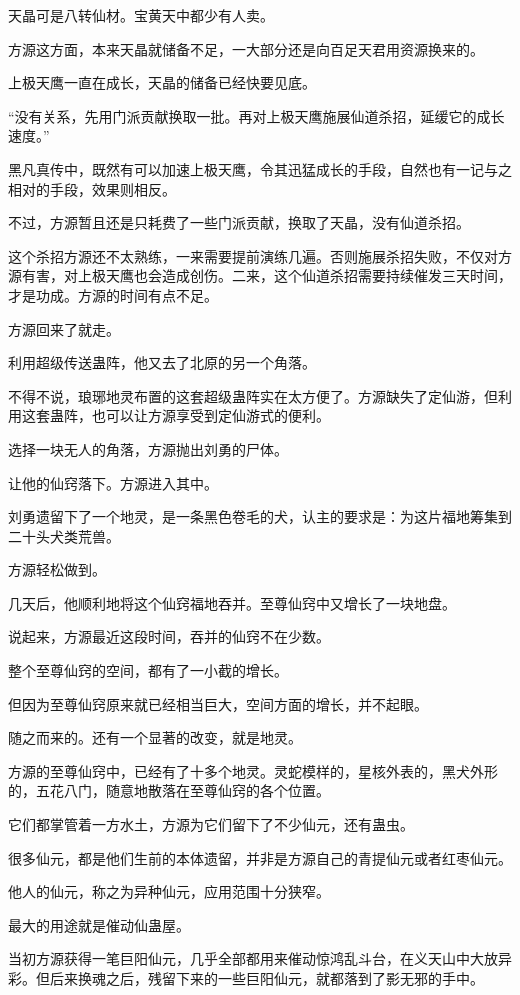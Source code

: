 \begin{this_body}
天晶可是八转仙材。宝黄天中都少有人卖。

方源这方面，本来天晶就储备不足，一大部分还是向百足天君用资源换来的。

上极天鹰一直在成长，天晶的储备已经快要见底。

“没有关系，先用门派贡献换取一批。再对上极天鹰施展仙道杀招，延缓它的成长速度。”

黑凡真传中，既然有可以加速上极天鹰，令其迅猛成长的手段，自然也有一记与之相对的手段，效果则相反。

不过，方源暂且还是只耗费了一些门派贡献，换取了天晶，没有仙道杀招。

这个杀招方源还不太熟练，一来需要提前演练几遍。否则施展杀招失败，不仅对方源有害，对上极天鹰也会造成创伤。二来，这个仙道杀招需要持续催发三天时间，才是功成。方源的时间有点不足。

方源回来了就走。

利用超级传送蛊阵，他又去了北原的另一个角落。

不得不说，琅琊地灵布置的这套超级蛊阵实在太方便了。方源缺失了定仙游，但利用这套蛊阵，也可以让方源享受到定仙游式的便利。

选择一块无人的角落，方源抛出刘勇的尸体。

让他的仙窍落下。方源进入其中。

刘勇遗留下了一个地灵，是一条黑色卷毛的犬，认主的要求是：为这片福地筹集到二十头犬类荒兽。

方源轻松做到。

几天后，他顺利地将这个仙窍福地吞并。至尊仙窍中又增长了一块地盘。

说起来，方源最近这段时间，吞并的仙窍不在少数。

整个至尊仙窍的空间，都有了一小截的增长。

但因为至尊仙窍原来就已经相当巨大，空间方面的增长，并不起眼。

随之而来的。还有一个显著的改变，就是地灵。

方源的至尊仙窍中，已经有了十多个地灵。灵蛇模样的，星核外表的，黑犬外形的，五花八门，随意地散落在至尊仙窍的各个位置。

它们都掌管着一方水土，方源为它们留下了不少仙元，还有蛊虫。

很多仙元，都是他们生前的本体遗留，并非是方源自己的青提仙元或者红枣仙元。

他人的仙元，称之为异种仙元，应用范围十分狭窄。

最大的用途就是催动仙蛊屋。

当初方源获得一笔巨阳仙元，几乎全部都用来催动惊鸿乱斗台，在义天山中大放异彩。但后来换魂之后，残留下来的一些巨阳仙元，就都落到了影无邪的手中。


\end{this_body}
